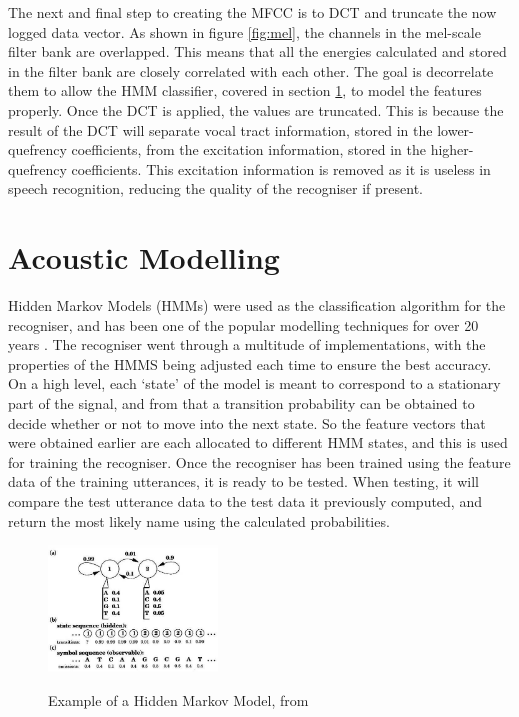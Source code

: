 \documentclass[journal]{IEEEtran}
\begin{document}
The next and final step to creating the MFCC is to DCT and truncate the now logged data vector. As shown in figure \ref{fig:mel}, the channels in the mel-scale filter bank are overlapped. This means that all the energies calculated and stored in the filter bank are closely correlated with each other. The goal is decorrelate them to allow the HMM classifier, covered in section \ref{AM}, to model the features properly. Once the DCT is applied, the values are truncated. This is because the result of the DCT will separate vocal tract information, stored in the lower-quefrency coefficients, from the excitation information, stored in the higher-quefrency coefficients. This excitation information is removed as it is useless in speech recognition, reducing the quality of the recogniser if present.


\section{Acoustic Modelling}\label{AM}
Hidden Markov Models (HMMs) were used as the classification algorithm for the recogniser, and has been one of the popular modelling techniques for over 20 years \cite{eddy1996hidden}. The recogniser went through a multitude of implementations, with the properties of the HMMS being adjusted each time to ensure the best accuracy. On a high level, each `state' of the model is meant to correspond to a stationary part of the signal, and from that a transition probability can be obtained to decide whether or not to move into the next state. So the feature vectors that were obtained earlier are each allocated to different HMM states, and this is used for training the recogniser. Once the recogniser has been trained using the feature data of the training utterances, it is ready to be tested. When testing, it will compare the test utterance data to the test data it previously computed, and return the most likely name using the calculated probabilities.

\begin{figure}[!htb]
	\centering
	\captionsetup{justification=centering}
	\includegraphics[width=0.4\textwidth]{hmm_example.jpg}\\
	\caption{Example of a Hidden Markov Model, from \cite{eddy1996hidden}}\label{fig:hmm}
\end{figure}
\end{document}
